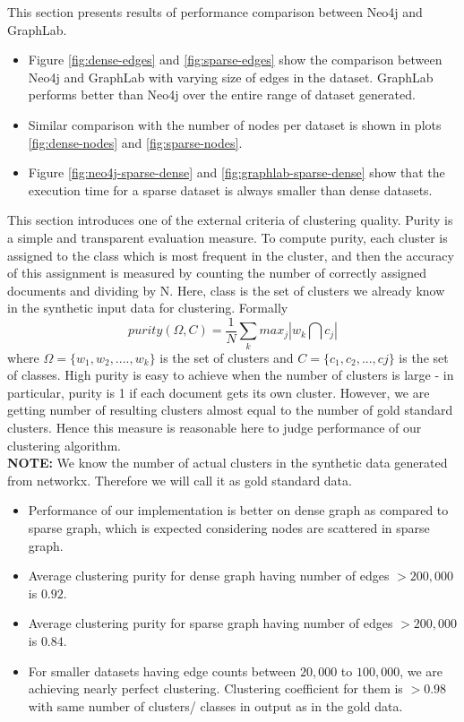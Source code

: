 This section presents results of performance comparison between Neo4j and GraphLab. 
\begin{itemize}
\item Figure \ref{fig:dense-edges} and \ref{fig:sparse-edges} show the comparison between Neo4j and GraphLab with varying size of edges in the dataset. GraphLab performs better than Neo4j over the entire range of dataset generated.
\item Similar comparison with the number of nodes per dataset is shown in plots \ref{fig:dense-nodes} and \ref{fig:sparse-nodes}.
\item Figure \ref{fig:neo4j-sparse-dense} and \ref{fig:graphlab-sparse-dense} show that the execution time for a sparse dataset is always smaller than dense datasets.
\end{itemize}
This section introduces one of the external criteria of clustering quality. Purity is a simple and transparent evaluation measure. To compute purity, each cluster is assigned to the class which is most frequent in the cluster, and then the accuracy of this assignment is measured by counting the number of correctly assigned documents and dividing by N. Here, class is the set of clusters we already know in the synthetic input data for clustering. Formally
\begin{equation}
purity(\Omega, C ) = \frac{1}{N}\sum_{k} max_{j}|w_{k} \bigcap c_{j}|
\end{equation}
where $\Omega = \{w_{1}, w_{2},....,w_{k}\}$ is the set of clusters and $C=\{c_{1},c_{2},...,c{j}\}$ is the set of classes.
High purity is easy to achieve when the number of clusters is large - in particular, purity is 1 if each document gets its own cluster. However, we are getting number of resulting clusters almost equal to the number of gold standard clusters. Hence this measure is reasonable here to judge performance of our clustering algorithm.\\
\textbf{NOTE:} We know the number of actual clusters in the synthetic data generated from networkx. Therefore we will call it as gold standard data.

\begin{itemize}
\item Performance of our implementation is better on dense graph as compared to sparse graph, which is expected considering nodes are scattered in sparse graph.
\item Average clustering purity for dense graph having number of edges $> 200,000$ is $0.92$.
\item Average clustering purity for sparse graph having number of edges $> 200,000$ is $0.84$.
\item For smaller datasets having edge counts between $20,000$ to $100,000$, we are achieving nearly perfect clustering. Clustering coefficient for them is $>0.98$ with same number of clusters/ classes in output as in the gold data.
\end{itemize}

